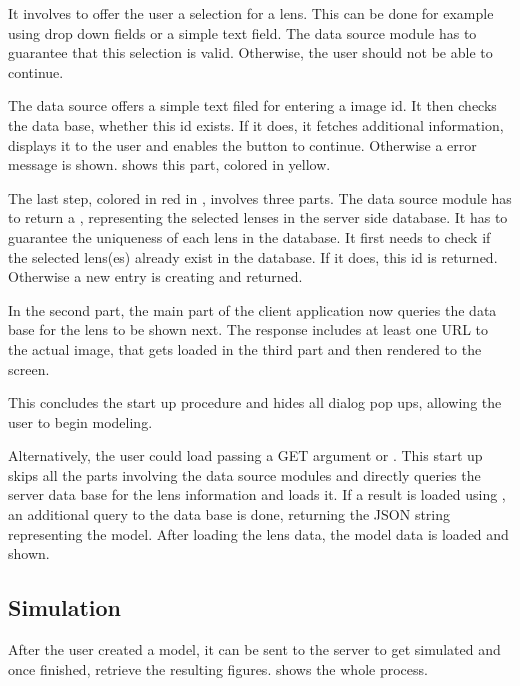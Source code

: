 

It involves to offer the user a selection for a lens.
This can be done for example using drop down fields or a simple text field.
The data source module has to guarantee that this selection is valid.
Otherwise, the user should not be able to continue.

The \sw data source offers a simple text filed for entering a \sw image id.
It then checks the \sw data base, whether this id exists.
If it does, it fetches additional information, displays it to the user and enables the button to continue.
Otherwise a error message is shown.
 shows this part, colored in yellow.

The last step, colored in red in , involves three parts.
The data source module has to return a , representing the selected lenses in the server side database.
It has to guarantee the uniqueness of each lens in the database.
It first needs to check if the selected lens(es) already exist in the database.
If it does, this id is returned. Otherwise a new entry is creating and returned.

In the second part, the main part of the client application now queries the data base for the lens to be shown next.
The response includes at least one URL to the actual image, that gets loaded in the third part and then rendered to the screen.

This concludes the start up procedure and hides all dialog pop ups, allowing the user to begin modeling.

Alternatively, the user could load \spl passing a GET argument  or .
This start up skips all the parts involving the data source modules and directly queries the server data base for the lens information and loads it.
If a result is loaded using , an additional query to the data base is done, returning the JSON string representing the model.
After loading the lens data, the model data is loaded and shown.



\subsection{Simulation}

After the user created a model, it can be sent to the server to get simulated and once finished, retrieve the resulting figures.  shows the whole process.

